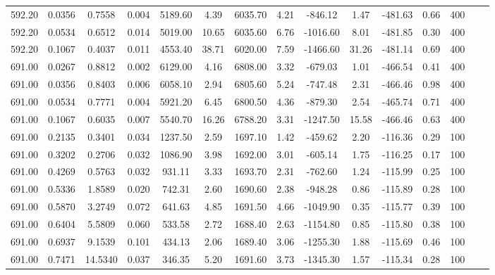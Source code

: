 \documentclass[%
 aip,
 jcp,
 sd,%
 amsmath,amssymb,
]{revtex4-1}
\begin{document}
\begin{table*}[!htbp]
\begin{ruledtabular}
\begin{tabular}{ccccccccccccccc}
592.20	&	0.0356	&	0.7558	&	0.004	&	5189.60	&	4.39	&	6035.70	&	4.21	&	-846.12	&	1.47	&	-481.63	&	0.66	&	400	\\
592.20	&	0.0534	&	0.6512	&	0.014	&	5019.00	&	10.65	&	6035.60	&	6.76	&	-1016.60	&	8.01	&	-481.85	&	0.30	&	400	\\
592.20	&	0.1067	&	0.4037	&	0.011	&	4553.40	&	38.71	&	6020.00	&	7.59	&	-1466.60	&	31.26	&	-481.14	&	0.69	&	400	\\
691.00	&	0.0267	&	0.8812	&	0.002	&	6129.00	&	4.16	&	6808.00	&	3.32	&	-679.03	&	1.01	&	-466.54	&	0.41	&	400	\\
691.00	&	0.0356	&	0.8403	&	0.006	&	6058.10	&	2.94	&	6805.60	&	5.24	&	-747.48	&	2.31	&	-466.46	&	0.98	&	400	\\
691.00	&	0.0534	&	0.7771	&	0.004	&	5921.20	&	6.45	&	6800.50	&	4.36	&	-879.30	&	2.54	&	-465.74	&	0.71	&	400	\\
691.00	&	0.1067	&	0.6035	&	0.007	&	5540.70	&	16.26	&	6788.20	&	3.31	&	-1247.50	&	15.58	&	-466.46	&	0.63	&	400	\\
691.00	&	0.2135	&	0.3401	&	0.034	&	1237.50	&	2.59	&	1697.10	&	1.42	&	-459.62	&	2.20	&	-116.36	&	0.29	&	100	\\
691.00	&	0.3202	&	0.2706	&	0.032	&	1086.90	&	3.98	&	1692.00	&	3.01	&	-605.14	&	1.75	&	-116.25	&	0.17	&	100	\\
691.00	&	0.4269	&	0.5763	&	0.032	&	931.11	&	3.33	&	1693.70	&	2.31	&	-762.60	&	1.24	&	-115.99	&	0.25	&	100	\\
691.00	&	0.5336	&	1.8589	&	0.020	&	742.31	&	2.60	&	1690.60	&	2.38	&	-948.28	&	0.86	&	-115.89	&	0.28	&	100	\\
691.00	&	0.5870	&	3.2749	&	0.072	&	641.63	&	4.85	&	1691.50	&	4.66	&	-1049.90	&	0.35	&	-115.77	&	0.39	&	100	\\
691.00	&	0.6404	&	5.5809	&	0.060	&	533.58	&	2.72	&	1688.40	&	2.63	&	-1154.80	&	0.85	&	-115.80	&	0.38	&	100	\\
691.00	&	0.6937	&	9.1539	&	0.101	&	434.13	&	2.06	&	1689.40	&	3.06	&	-1255.30	&	1.88	&	-115.69	&	0.46	&	100	\\
691.00	&	0.7471	&	14.5340	&	0.037	&	346.35	&	5.20	&	1691.60	&	3.73	&	-1345.30	&	1.57	&	-115.34	&	0.28	&	100	\\
\end{tabular}
\end{ruledtabular}
\end{table*}
\end{document}

